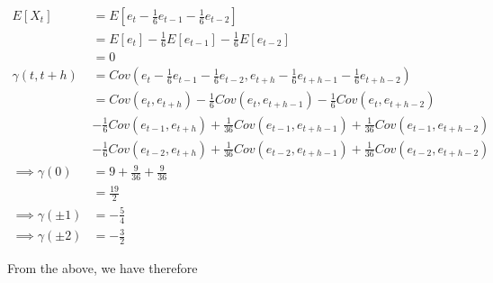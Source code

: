 \documentclass[10pt,a4paper]{exam}
\begin{document}
\begin{questions}
\begin{parts}
\begin{solution}
\begin{align*}
E[X_t]		&= E\left[e_t - \frac{1}{6}e_{t-1} - \frac{1}{6}e_{t-2}\right]\\
				&= E[e_t] - \frac{1}{6}E[e_{t-1}] - \frac{1}{6}E[e_{t-2}]\\
				&= 0\\
\gamma(t, t+h)	&= Cov\left(e_t - \frac{1}{6}e_{t-1} - \frac{1}{6}e_{t-2}, e_{t+h} - \frac{1}{6}e_{t+h-1} - \frac{1}{6}e_{t+h-2} \right)\\
						&= Cov(e_t, e_{t+h}) - \frac{1}{6}Cov(e_t, e_{t+h-1}) - \frac{1}{6}Cov(e_t, e_{t+h-2})\\
						& -\frac{1}{6}Cov(e_{t-1}, e_{t+h}) +\frac{1}{36}Cov(e_{t-1}, e_{t+h-1}) +\frac{1}{36}Cov(e_{t-1}, e_{t+h-2})\\
						& -\frac{1}{6}Cov(e_{t-2}, e_{t+h}) +\frac{1}{36}Cov(e_{t-2}, e_{t+h-1}) +\frac{1}{36}Cov(e_{t-2}, e_{t+h-2})\\
\implies \gamma(0)	&= 9 + \frac{9}{36} + \frac{9}{36}\\
								&= \frac{19}{2}\\
\implies \gamma(\pm 1)	&= -\frac{5}{4}\\
\implies \gamma(\pm 2)	&= -\frac{3}{2}
\end{align*}

From the above, we have therefore


\end{solution}
\end{parts}
\end{questions}
\end{document}
